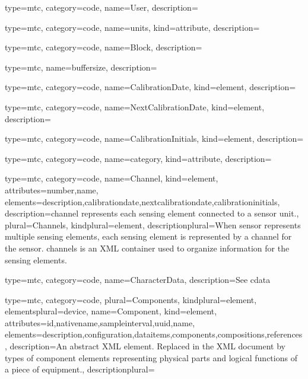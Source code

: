 {
  type=mtc,
  category=code,
  name={User},
  description={}
}


{
  type=mtc,
  category=code,
  name={units},
  kind={attribute},
  description={}
}


{
  type=mtc,
  category=code,
  name={Block},
  description={}
}


{
  type=mtc,
  name=buffersize,
  description={}
}


{
  type=mtc,
  category=code,
  name={CalibrationDate},
  kind={element},
  description={}
}


{
  type=mtc,
  category=code,
  name={NextCalibrationDate},
  kind={element},
  description={}
}


{
  type=mtc,
  category=code,
  name={CalibrationInitials},
  kind={element},
  description={}
}


{
  type=mtc,
  category=code,
  name={category},
  kind={attribute},
  description={}
}


{
  type=mtc,
  category=code,
  name={Channel},
  kind={element},
  attributes={\gls{number},\gls{name}},
  elements={\gls{description},\gls{calibrationdate},\gls{nextcalibrationdate},\gls{calibrationinitials}},
  description={\gls{channel} represents each \gls{sensing element} connected to a \gls{sensor unit}.},
  plural={Channels},
  kindplural={element},
  descriptionplural={When \gls{sensor} represents multiple \glspl{sensing element}, each \gls{sensing element} is represented by a \gls{channel} for the \gls{sensor}. \glspl{channel} is an XML container used to organize information for the \glspl{sensing element}. }
}


{
  type=mtc,
  category=code,
  name={CharacterData},
  description={See \gls{cdata}}
}



{
  type=mtc,
  category=code,
  plural={Components},
  kindplural={element},
  elementsplural={\gls{device}},
  name={Component},
  kind={element},
  attributes={\gls{id},\gls{nativename},\gls{sampleinterval},\gls{uuid},\gls{name}},
  elements={\gls{description},\gls{configuration},\glspl{dataitem},\glspl{component},\glspl{composition},\glspl{reference}},
  description={An abstract XML element. Replaced in the XML document by types of \gls{component} elements representing physical parts and logical functions of a piece of equipment.},
  descriptionplural={} 
}


